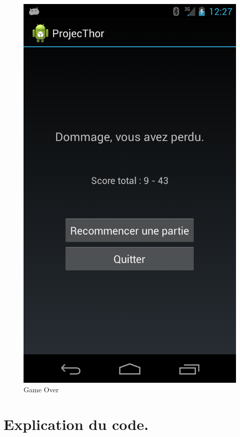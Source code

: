 \begin{figure}
	\begin{minipage}{0.45\textwidth}
		\caption{Game Over}
		\label{view_6}
		\center
		\includegraphics[scale=0.2]{view_6.png}
	\end{minipage}

\end{figure}

\section{Explication du code.}

